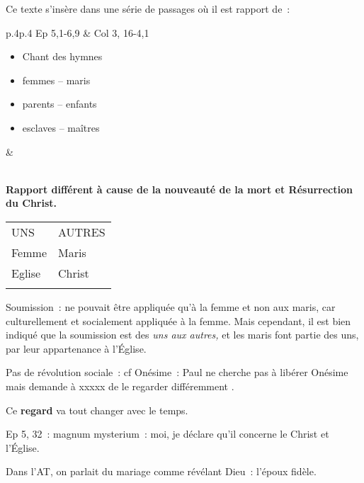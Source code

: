 Ce texte s'insère dans une série de passages où il est rapport de~:



\begin{table}[h!]
    \centering
    \sidecaption{  }
 
\begin{tabular}{p{.4\textwidth}p{.4\textwidth}}
\toprule
Ep 5,1-6,9 & Col 3, 16-4,1 \\
 {\linewidth}\raggedright
\begin{itemize}
\item
  Chant des hymnes
\item
  femmes -- maris
\item
  parents -- enfants
\item
  esclaves -- maîtres
\end{itemize}
  & \\
\\
\bottomrule
\end{tabular}
\label{tab:my_label}
\end{table}

\textbf{Rapport différent à cause de la nouveauté de la mort et
Résurrection du Christ.}

\begin{table}[h!]
    \centering
    \sidecaption{  }
 
\begin{tabular}{p{}p{}}
\toprule
UNS & AUTRES \\
Femme & Maris \\
Eglise & Christ \\
\\
\bottomrule
\end{tabular}
\label{tab:my_label}
\end{table}
 

Soumission~: ne pouvait être appliquée qu'à la femme et non aux maris,
car culturellement et socialement appliquée à la femme. Mais cependant,
il est bien indiqué que la soumission est des \emph{uns aux autres,} et
les maris font partie des uns, par leur appartenance à l'Église.

Pas de révolution sociale~: cf Onésime~: Paul ne cherche pas à libérer
Onésime mais demande à xxxxx de le regarder différemment .

Ce \textbf{regard} va tout changer avec le temps.

Ep 5, 32~: magnum mysterium~: moi, je déclare qu'il concerne le Christ
et l'Église.

Dans l'AT, on parlait du mariage comme révélant Dieu~: l'époux fidèle.

